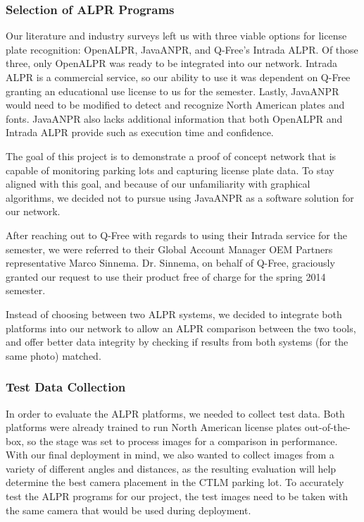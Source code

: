 \documentclass[11pt, oneside, fullpage, doublespace]{article}
\begin{document}
\subsubsection{Selection of ALPR Programs}
Our literature and industry surveys left us with three viable options for license plate recognition: OpenALPR, JavaANPR, and Q-Free's Intrada ALPR. Of those three, only OpenALPR was ready to be integrated into our network. Intrada ALPR is a commercial service, so our ability to use it was dependent on Q-Free granting an educational use license to us for the semester. Lastly, JavaANPR would need to be modified to detect and recognize North American plates and fonts. JavaANPR also lacks additional information that both OpenALPR and Intrada ALPR provide such as execution time and confidence.

The goal of this project is to demonstrate a proof of concept network that is capable of monitoring parking lots and capturing license plate data. To stay aligned with this goal, and because of our unfamiliarity with graphical algorithms, we decided not to pursue using JavaANPR as a software solution for our network.

After reaching out to Q-Free with regards to using their Intrada service for the semester, we were referred to their Global Account Manager OEM Partners representative Marco Sinnema. Dr. Sinnema, on behalf of Q-Free, graciously granted our request to use their product free of charge for the spring 2014 semester.

Instead of choosing between two ALPR systems, we decided to integrate both platforms into our network to allow an ALPR comparison between the two tools, and offer better data integrity by checking if results from both systems (for the same photo) matched.

\subsubsection{Test Data Collection}
In order to evaluate the ALPR platforms, we needed to collect test data. Both platforms were already trained to run North American license plates out-of-the-box, so the stage was set to process images for a comparison in performance. With our final deployment in mind, we also wanted to collect images from a variety of different angles and distances, as the resulting evaluation will help determine the best camera placement in the CTLM parking lot. To accurately test the ALPR programs for our project, the test images need to be taken with the same camera that would be used during deployment.
\end{document}
